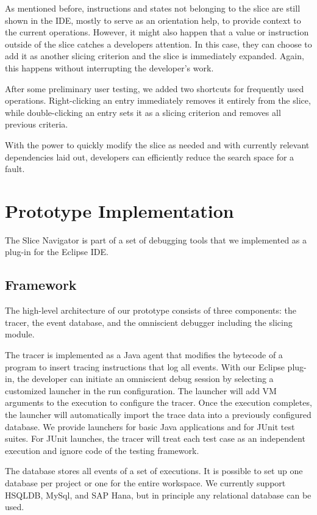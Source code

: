 \documentclass[
			english,
			review,
			]{elsarticle}
\begin{document}
As mentioned before, instructions and states not belonging to the slice are still shown in the IDE, mostly to serve as an orientation help, to provide context to the current operations.
However, it might also happen that a value or instruction outside of the slice catches a developers attention.
In this case, they can choose to add it as another slicing criterion and the slice is immediately expanded.
Again, this happens without interrupting the developer's work.

After some preliminary user testing, we added two shortcuts for frequently used operations.
Right-clicking an entry immediately removes it entirely from the slice, while double-clicking an entry sets it as a slicing criterion and removes all previous criteria.

With the power to quickly modify the slice as needed and with currently relevant dependencies laid out, developers can efficiently reduce the search space for a fault.

\section{Prototype Implementation}
\label{sec:impl}

The Slice Navigator is part of a set of debugging tools that we implemented as a plug-in for the Eclipse IDE.

\subsection{Framework}

The high-level architecture of our prototype consists of three components: the tracer, the event database, and the omniscient debugger including the slicing module.

The tracer is implemented as a Java agent that modifies the bytecode of a program to insert tracing instructions that log all events.
With our Eclipse plug-in, the developer can initiate an omniscient debug session by selecting a customized launcher in the run configuration.
The launcher will add VM arguments to the execution to configure the tracer.
Once the execution completes, the launcher will automatically import the trace data into a previously configured database.
We provide launchers for basic Java applications and for JUnit test suites.
For JUnit launches, the tracer will treat each test case as an independent execution and ignore code of the testing framework.

The database stores all events of a set of executions.
It is possible to set up one database per project or one for the entire workspace.
We currently support HSQLDB, MySql, and SAP Hana, but in principle any relational database can be used.
\end{document}
